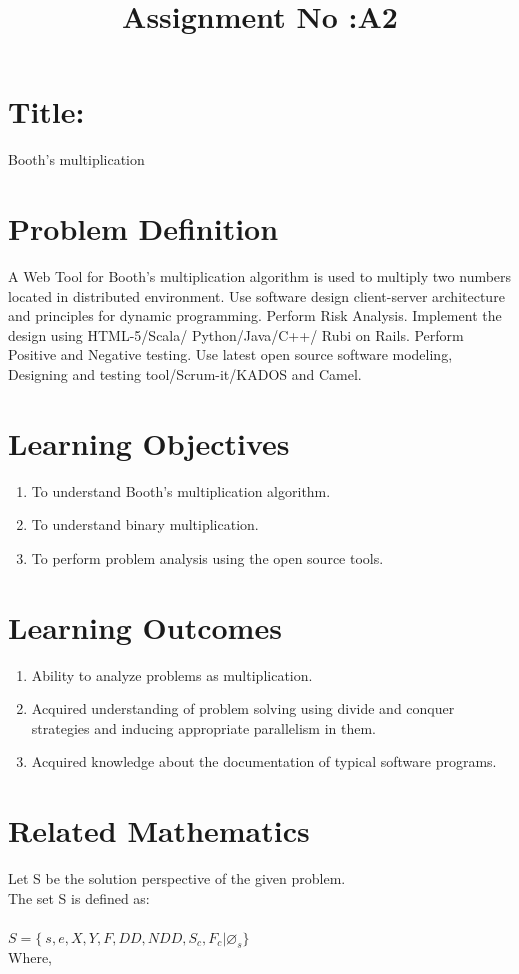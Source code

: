 \documentclass[10pt,a4paper]{article}
\title{Assignment No :A2}
\date{}
\begin{document}
\maketitle
\section{Title:}
Booth's multiplication

\section{Problem Definition}
A Web Tool for Booth's multiplication algorithm is used to multiply two numbers located in distributed
environment. Use software design client-server architecture and principles for dynamic programming.
Perform Risk Analysis. Implement the design using HTML-5/Scala/ Python/Java/C++/ Rubi on Rails.
Perform Positive and Negative testing. Use latest open source software modeling, Designing and testing
tool/Scrum-it/KADOS and Camel.

\section{Learning Objectives}
\begin{enumerate}
\item To understand Booth's multiplication algorithm.
\item To understand binary multiplication.
\item To perform problem analysis using the open source tools.
\end{enumerate}

\section{Learning Outcomes}
\begin{enumerate}
\item Ability to analyze problems as multiplication.
\item Acquired understanding of problem solving using divide and conquer strategies and inducing appropriate parallelism in them.
\item Acquired knowledge about the documentation of typical software programs.
\end{enumerate}


\section{Related Mathematics}
Let S be the solution perspective of the given problem.\\
The set S is defined as:\\\\
$S=\lbrace\ s,e,X,Y,F,DD,NDD,S_{c},F_{c}|\varnothing_{s}\rbrace$ \\
Where,
\end{document}

